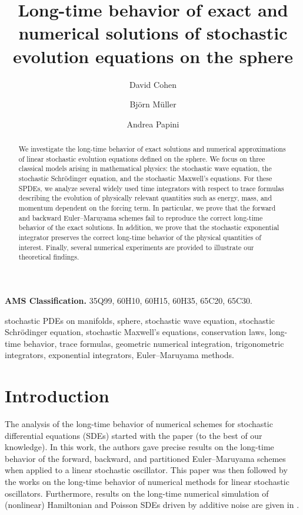 \documentclass[11pt]{amsart}
\author{David Cohen}
\author{Bj\"orn M\"uller}
\author{Andrea Papini}
\begin{document}
\title[Long-time behavior of stochastic evolution equations on the sphere]{Long-time behavior of exact and numerical solutions of stochastic evolution equations on the sphere}

\begin{abstract}
	We investigate the long-time behavior of exact solutions and numerical approximations of linear stochastic evolution equations defined on the sphere.
	We focus on three classical models arising in mathematical physics: the stochastic wave equation, the stochastic Schrödinger equation, and the stochastic Maxwell's equations.
	For these SPDEs, we analyze several widely used time integrators with respect to trace formulas describing the evolution of physically relevant quantities such as energy, mass, and momentum dependent on the forcing term. In particular, we prove that the forward and backward Euler--Maruyama schemes fail to reproduce the correct long-time behavior of the exact solutions. In addition, we prove that the stochastic exponential integrator preserves the correct long-time behavior of the physical quantities of interest.
	Finally, several numerical experiments are provided to illustrate our theoretical findings.
\end{abstract}

\maketitle
{\small\noindent
{\bf AMS Classification.} 35Q99, 60H10, 60H15, 60H35, 65C20, 65C30.

\bigskip{} stochastic PDEs on manifolds, sphere, stochastic wave equation, stochastic Schrödinger equation, stochastic Maxwell's equations, conservation laws, long-time behavior, trace formulas, geometric numerical integration, trigonometric integrators, exponential integrators, Euler--Maruyama methods.}

\section{Introduction}\label{sec-intro}

The analysis of the long-time behavior of numerical schemes for stochastic differential equations (SDEs) started with the paper \cite{MR2083326} (to the best of our knowledge). In this work, the authors gave precise results on the long-time behavior of the forward, backward, and partitioned Euler--Maruyama schemes when applied to a linear stochastic oscillator.
This paper was then followed by the works \cite{MR2922170,MR2909913,MR3831957,MR3608313,MR2333534,MR3923632,MR3348201,MR3906838,MR2312503,math14010017,MR3702519}
on the long-time behavior of numerical methods for linear stochastic oscillators. Furthermore, results on the long-time numerical simulation
of (nonlinear) Hamiltonian and Poisson SDEs driven by additive noise are given in \cite{MR2926251,MR3172331,MR4077238,MR4375496,MR3579605}.
\end{document}
